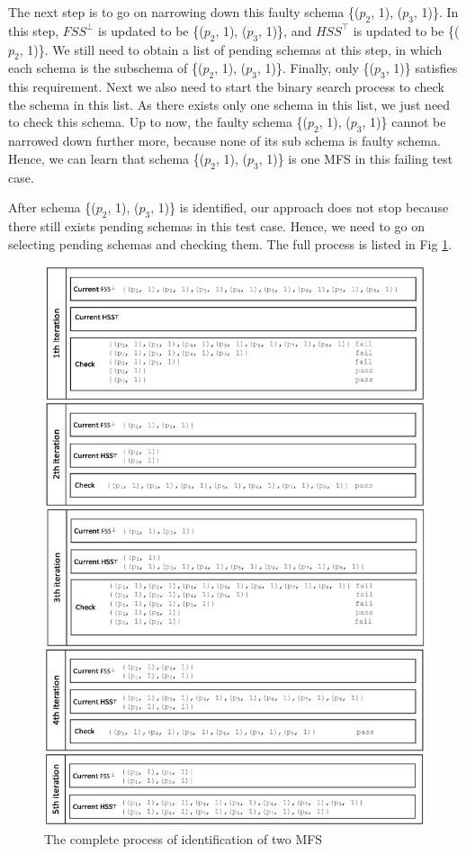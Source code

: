 \documentclass{sig-alternate-05-2015}
\begin{document}
{The next step is to go on narrowing down this faulty schema \{($p_{2}$, 1), ($p_{3}$, 1)\}. In this step, $FSS^{\bot}$ is updated to be \{($p_{2}$, 1), ($p_{3}$, 1)\}, and $HSS^{\top}$ is updated to be \{($p_{2}$, 1)\}. We still need to obtain a list of pending schemas at this step, in which each schema is the subschema of \{($p_{2}$, 1), ($p_{3}$, 1)\}. Finally, only \{($p_{3}$, 1)\} satisfies this requirement.  Next we also need to start the binary search process to check the schema in this list. As there exists only one schema in this list, we just need to check this schema. Up to now, the faulty schema \{($p_{2}$, 1), ($p_{3}$, 1)\} cannot be narrowed down further more, because none of its sub schema is faulty schema. Hence, we can learn that schema  \{($p_{2}$, 1), ($p_{3}$, 1)\} is one MFS in this failing test case.


After schema \{($p_{2}$, 1), ($p_{3}$, 1)\} is identified, our approach does not stop because there still exists pending schemas in this test case. Hence, we need to go on selecting pending schemas and checking them. The full process is listed in Fig \ref{fig_exofalo2}.

\begin{figure}
 \centering
 \includegraphics[width=6.1in]{exofalo2.eps}
 \caption{The complete process of identification of two MFS}
 \label{fig_exofalo2}
\end{figure}

}
\end{document}
